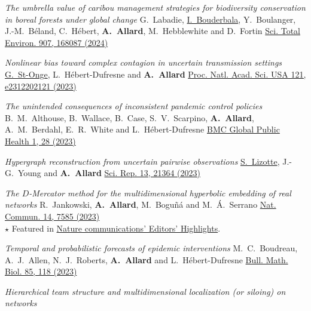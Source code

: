 \documentclass[11pt]{article}
\makeatletter
\newcommand{\reversearabic}[1]{\expandafter\@reversearabic\csname c@#1\endcsname}
\newcommand{\@reversearabic}[1]{%
  \number\numexpr\getrefnumber{this@etaremune@\romannumeral\c@etaremune}-#1+1\relax
}
\newcounter{etaremune}
\newenvironment{etaremune}[1][]{%
  \stepcounter{etaremune}%
  \begin{enumerate}[label=\reversearabic*.,#1]%
}{%
  \edef\@currentlabel{\the\csname c@\@enumctr\endcsname}%
  \label{this@etaremune@\romannumeral\c@etaremune}%
  \end{enumerate}%
}
\makeatother
\begin{document}
\begin{etaremune}[itemsep=0.5em, label={[A\reversearabic*]}]
%
  \item \parbox[t]{\textwidth-30pt}{\textit{The umbrella value of caribou management strategies for biodiversity conservation in boreal forests under global change}\split
  G.~Labadie, \uline{I.~Bouderbala}, Y.~Boulanger, J.-M.~Béland, C.~Hébert, \textbf{A.~Allard}, M.~Hebblewhite and D.~Fortin\split
  \href{https://doi.org/10.1016/j.scitotenv.2023.168087}{Sci. Total Environ. 907, 168087 (2024)}}
%
  \item \parbox[t]{\textwidth-30pt}{\textit{Nonlinear bias toward complex contagion in uncertain transmission settings}\split
  \uline{G.~St-Onge}, L.~Hébert-Dufresne and \textbf{A.~Allard}\split
  \href{https://doi.org/10.1073/pnas.2312202121}{Proc. Natl. Acad. Sci. USA 121, e2312202121 (2023)}}
%
  \item \parbox[t]{\textwidth-30pt}{\textit{The unintended consequences of inconsistent pandemic control policies}\split
  B.~M.~Althouse, B.~Wallace, B.~Case, S.~V.~Scarpino, \textbf{A.~Allard}, A.~M.~Berdahl, E.~R.~White and L.~Hébert-Dufresne\split
  \href{https://doi.org/10.1186/s44263-023-00028-z}{BMC Global Public Health 1, 28 (2023)}}
%
  \item \parbox[t]{\textwidth-30pt}{\textit{Hypergraph reconstruction from uncertain pairwise observations}\split
  \uline{S.~Lizotte}, J.-G.~Young and \textbf{A.~Allard}\split
  \href{https://doi.org/10.1038/s41598-023-48081-w}{Sci. Rep. 13, 21364 (2023)}}
%
  \item \parbox[t]{\textwidth-30pt}{\textit{The $D$-Mercator method for the multidimensional hyperbolic embedding of real networks}\split
  R.~Jankowski, \textbf{A.~Allard}, M.~Bogu\~n\'a and M.~\'A.~Serrano\split
  \href{https://doi.org/10.1038/s41467-023-43337-5}{Nat. Commun. 14, 7585 (2023)}\\
  {\footnotesize $\star$ Featured in \href{https://www.nature.com/ncomms/editorshighlights}{Nature communications' Editors' Highlights}.}}
%
  \item \parbox[t]{\textwidth-30pt}{\textit{Temporal and probabilistic forecasts of epidemic interventions}\split
  M.~C.~Boudreau, A.~J.~Allen, N.~J.~Roberts, \textbf{A.~Allard} and L.~H\'ebert-Dufresne\split
  \href{https://doi.org/10.1007/s11538-023-01220-w}{Bull. Math. Biol. 85, 118 (2023)}}
%
  \item \parbox[t]{\textwidth-30pt}{\textit{Hierarchical team structure and multidimensional localization (or siloing) on networks}\split
}
\end{etaremune}
\end{document}
